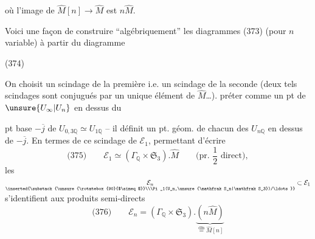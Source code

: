 où l'image de $\widehat M[n]\longrightarrow\widehat M$ est $n\widehat M$.

Voici  une façon de construire ``algébriquement'' les diagrammes (373) (pour $n$ variable) à partir du diagramme

\begin{samepage}
\noindent (374)
\end{samepage}

On choisit un  scindage de la première i.e. un scindage de la seconde (deux tels scindages sont conjugués par un unique élément de $\widehat M$\ldots).
 préter comme un pt  de $\unsure{U_\infty|U_n}$ en dessus du


pt base $-\overline j$ de $U_{0,3\mathbb Q}\simeq U_{1\mathbb Q}$ -- il définit un pt. géom. de chacun des $U_{n\mathbb Q}$ en dessus de $-\overline j$. En termes de ce scindage de $\mathcal E_1$, permettant d'écrire
\[
\text{(375)}\qquad \mathcal E_1\simeq(\Gamma_{\mathbb Q}\times\mathfrak S_3).\widehat M
\qquad\text{(pr. $\frac12$ direct)},
\]
les $\underset{\inserted{\substack{\unsure{\rotatebox{90}{$\simeq$}}\\\Pi_1(U_n,\unsure{\mathfrak S_n|\mathfrak S_3})/\ldots}}}{\mathcal E_n}\subset\mathcal E_1$ s'identifient aux produits semi-directs
\[
\text{(376)}\qquad \mathcal E_n=(\Gamma_{\mathbb Q}\times\mathfrak S_3).
\underbrace{(n\widehat M)}_{\overset{\text{dfn}}{=}\widehat M[n]}
\]

